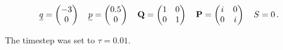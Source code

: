 \begin{align*}
  \underline{q} = \begin{pmatrix}
              -3 \\ 0
            \end{pmatrix}
  \quad
  \underline{p} = \begin{pmatrix}
              0.5 \\ 0
            \end{pmatrix}
  \quad
  \mathbf{Q} = \begin{pmatrix}
              1 & 0 \\ 0 & 1
            \end{pmatrix}
  \quad
  \mathbf{P} = \begin{pmatrix}
              i & 0 \\ 0 & i
            \end{pmatrix}
  \quad
  S = 0 \,.
\end{align*}

The timestep was set to $\tau = 0.01$.


